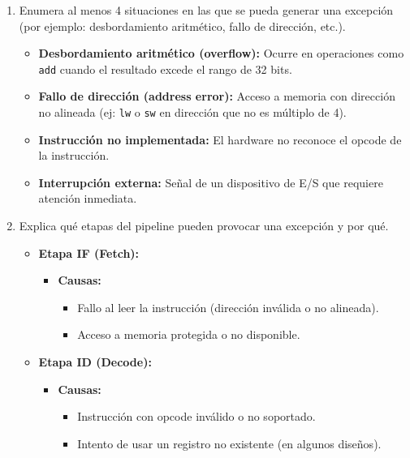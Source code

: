 \documentclass{article}
\begin{document}
\begin{enumerate}[label=\alph*)]
    \item Enumera al menos 4 situaciones en las que se pueda generar una excepción (por ejemplo: desbordamiento aritmético, fallo de dirección, etc.).

    \begin{itemize}
        \item \textbf{Desbordamiento aritmético (overflow):} Ocurre en operaciones como \texttt{add} cuando el resultado excede el rango de 32 bits.
        \item \textbf{Fallo de dirección (address error):} Acceso a memoria con dirección no alineada (ej: \texttt{lw} o \texttt{sw} en dirección que no es múltiplo de 4).
        \item \textbf{Instrucción no implementada:} El hardware no reconoce el opcode de la instrucción.
        \item \textbf{Interrupción externa:} Señal de un dispositivo de E/S que requiere atención inmediata.
    \end{itemize}

    \item Explica qué etapas del pipeline pueden provocar una excepción y por qué.

    
    \begin{itemize}
        \item \textbf{Etapa IF (Fetch):}
        \begin{itemize}
            \item \textbf{Causas:}
            \begin{itemize}
                \item Fallo al leer la instrucción (dirección inválida o no alineada).
                \item Acceso a memoria protegida o no disponible.
            \end{itemize}
        \end{itemize}

        \item \textbf{Etapa ID (Decode):}
        \begin{itemize}
            \item \textbf{Causas:}
            \begin{itemize}
                \item Instrucción con opcode inválido o no soportado.
                \item Intento de usar un registro no existente (en algunos diseños).
            \end{itemize}
        \end{itemize}


\end{itemize}
\end{enumerate}
\end{document}
